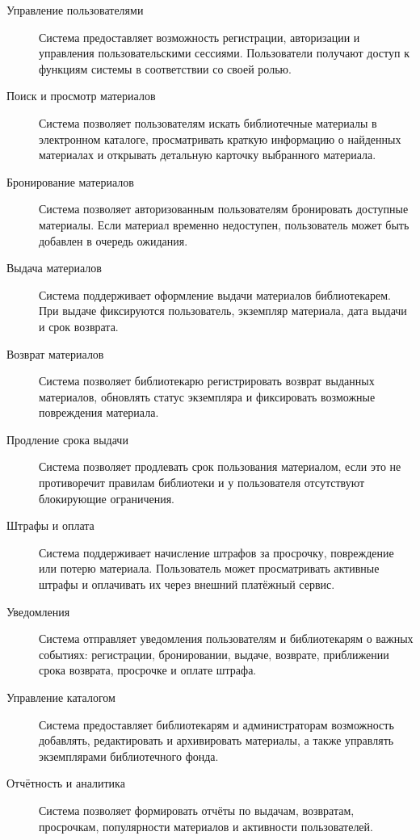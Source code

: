 \documentclass[12pt,a4paper]{article}
\begin{document}
	\begin{description}
		\item[Управление пользователями]
		Система предоставляет возможность регистрации, авторизации и управления
		пользовательскими сессиями. Пользователи получают доступ к функциям системы
		в соответствии со своей ролью.
		
		\item[Поиск и просмотр материалов]
		Система позволяет пользователям искать библиотечные материалы в электронном
		каталоге, просматривать краткую информацию о найденных материалах и открывать
		детальную карточку выбранного материала.
		
		\item[Бронирование материалов]
		Система позволяет авторизованным пользователям бронировать доступные материалы.
		Если материал временно недоступен, пользователь может быть добавлен в очередь
		ожидания.
		
		\item[Выдача материалов]
		Система поддерживает оформление выдачи материалов библиотекарем. При выдаче
		фиксируются пользователь, экземпляр материала, дата выдачи и срок возврата.
		
		\item[Возврат материалов]
		Система позволяет библиотекарю регистрировать возврат выданных материалов,
		обновлять статус экземпляра и фиксировать возможные повреждения материала.
		
		\item[Продление срока выдачи]
		Система позволяет продлевать срок пользования материалом, если это не
		противоречит правилам библиотеки и у пользователя отсутствуют блокирующие
		ограничения.
		
		\item[Штрафы и оплата]
		Система поддерживает начисление штрафов за просрочку, повреждение или потерю
		материала. Пользователь может просматривать активные штрафы и оплачивать их
		через внешний платёжный сервис.
		
		\item[Уведомления]
		Система отправляет уведомления пользователям и библиотекарям о важных событиях:
		регистрации, бронировании, выдаче, возврате, приближении срока возврата,
		просрочке и оплате штрафа.
		
		\item[Управление каталогом]
		Система предоставляет библиотекарям и администраторам возможность добавлять,
		редактировать и архивировать материалы, а также управлять экземплярами
		библиотечного фонда.
		
		\item[Отчётность и аналитика]
		Система позволяет формировать отчёты по выдачам, возвратам, просрочкам,
		популярности материалов и активности пользователей.
	\end{description}
	
\end{document}
